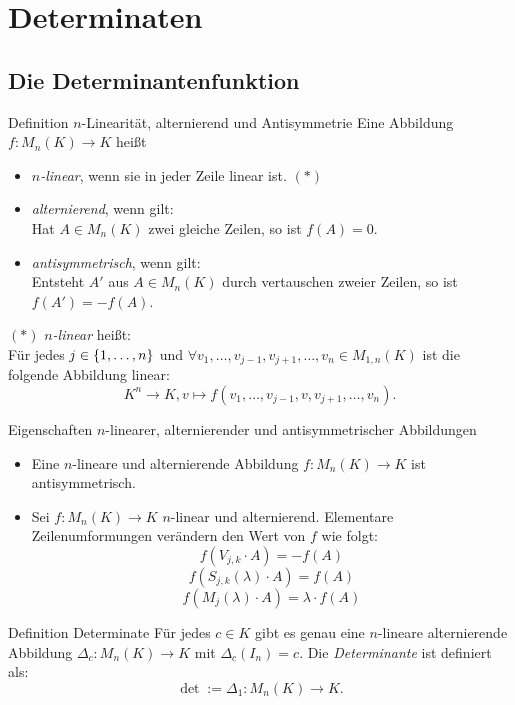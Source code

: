 \documentclass[main.tex]{subfiles}
\begin{document}
\section*{Determinaten}

\subsection*{Die Determinantenfunktion}

\begin{karte}{Definition \(n\)-Linearität, alternierend und Antisymmetrie}
    Eine Abbildung \(f: M_n(K) \rightarrow K\) heißt
    \begin{itemize}
        \item \textit{\(n\)-linear}, wenn sie in jeder Zeile linear ist. \( (*) \)
        \item \textit{alternierend}, wenn gilt: \\
        Hat \(A \in M_n(K)\) zwei gleiche Zeilen, so ist  \(f(A) = 0\).
       \item \textit{antisymmetrisch}, wenn gilt:\\
        Entsteht \(A'\) aus \(A \in M_n(K)\) durch vertauschen zweier
        Zeilen, so ist \(f(A') = -f(A)\).
    \end{itemize}
    \( (*) \) \textit{\(n\)-linear} heißt: \\
    Für jedes \(j \in \{1,\ldots,n\}\) und \(\forall v_1, 
    \ldots,v_{j-1},v_{j+1},\ldots,v_n \in M_{1,n}(K)\) ist 
    die \\ 
    folgende Abbildung linear:
    \[K^n \rightarrow K, v \mapsto f(v_1, \ldots,v_{j-1},v,v_{j+1},\ldots,v_n).\]
\end{karte}
\begin{karte}{Eigenschaften \(n\)-linearer, alternierender und antisymmetrischer Abbildungen}
    \begin{itemize}
        \item Eine \(n\)-lineare und alternierende Abbildung 
        \(f: M_n(K) \rightarrow K\) ist antisymmetrisch.
        \item Sei \(f: M_n(K) \rightarrow K\) \(n\)-linear und alternierend.
        Elementare Zeilenumformungen verändern den Wert von \(f\) wie folgt: 
        \[f(V_{j,k} \cdot A) = -f(A)\]
        \[f(S_{j,k}(\lambda) \cdot A) = f(A)\]
        \[f(M_j(\lambda) \cdot A) = \lambda \cdot f(A)\]
    \end{itemize}
\end{karte}
\begin{karte}{Definition Determinate}
    Für jedes \(c \in K\) gibt es genau eine \(n\)-lineare alternierende
    Abbildung \(\Delta_c: M_n(K) \rightarrow K\) mit \(\Delta_c(I_n) = c \).
    Die \textit{Determinante} ist definiert als: 
    \[\det := \Delta_1: M_n(K) \rightarrow K.\]
\end{karte}
\end{document}
